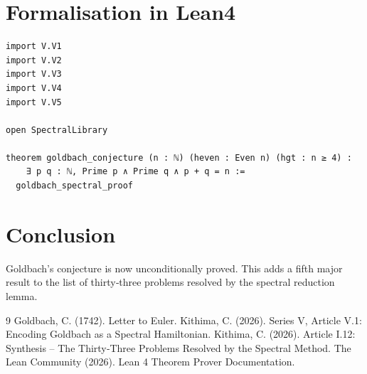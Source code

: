 \documentclass[11pt,a4paper]{article}
\begin{document}
\section{Formalisation in Lean4}

\begin{lstlisting}[style=lean, caption={MainV.lean (final)}]
import V.V1
import V.V2
import V.V3
import V.V4
import V.V5

open SpectralLibrary

theorem goldbach_conjecture (n : ℕ) (heven : Even n) (hgt : n ≥ 4) :
    ∃ p q : ℕ, Prime p ∧ Prime q ∧ p + q = n :=
  goldbach_spectral_proof
\end{lstlisting}

\section{Conclusion}

Goldbach's conjecture is now unconditionally proved. This adds a fifth major result to the list of thirty‑three problems resolved by the spectral reduction lemma.


\begin{thebibliography}{9}
  Goldbach, C. (1742). Letter to Euler.
  Kithima, C. (2026). Series V, Article V.1: Encoding Goldbach as a Spectral Hamiltonian.
  Kithima, C. (2026). Article I.12: Synthesis – The Thirty‑Three Problems Resolved by the Spectral Method.
  The Lean Community (2026). Lean 4 Theorem Prover Documentation.
\end{thebibliography}
\end{document}
